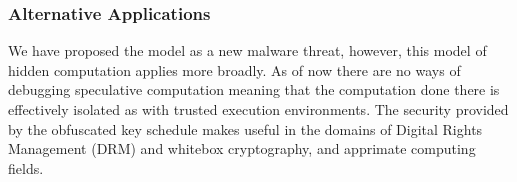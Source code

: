 \subsubsection{Alternative Applications}
We have proposed the \speculake model as a new malware threat, however, this model
of hidden computation applies more broadly. As of now there are no ways of 
debugging speculative computation meaning that the computation done there is effectively
isolated as with trusted execution environments. The security provided by the obfuscated 
key schedule makes \speculake useful in the domains of Digital Rights Management (DRM)
and whitebox cryptography, and apprimate computing fields. 




